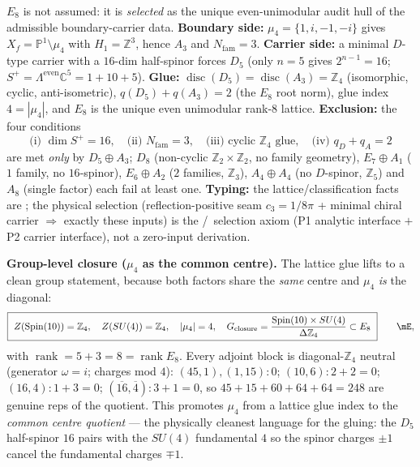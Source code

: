 \documentclass[11pt,a4paper]{article}
\newcommand{\Nfam}{N_{\mathrm{fam}}}
\newcommand{\cthree}{c_3}
\newcommand{\PP}{\mathbb{P}}
\newcommand{\Z}{\mathbb{Z}}
\theoremstyle{definition}
\begin{document}
\begin{keybox}
$E_8$ is not assumed: it is \emph{selected} as the unique even-unimodular audit hull of the admissible
boundary-carrier data. \textbf{Boundary side:} $\mu_4=\{1,i,-1,-i\}$ gives $X_f=\PP^1\setminus\mu_4$ with
$H_1=\Z^3$, hence $A_3$ and $\Nfam=3$. \textbf{Carrier side:} a minimal $D$-type carrier with a $16$-dim
half-spinor forces $D_5$ (only $n=5$ gives $2^{n-1}=16$; $S^+=\Lambda^{\mathrm{even}}\mathbb C^5=1{+}10{+}5$).
\textbf{Glue:} $\operatorname{disc}(D_5)=\operatorname{disc}(A_3)=\Z_4$ (isomorphic, cyclic, anti-isometric),
$q(D_5)+q(A_3)=2$ (the $E_8$ root norm), glue index $4=|\mu_4|$, and $E_8$ is the unique even unimodular
rank-$8$ lattice. \textbf{Exclusion:} the four conditions
\[
  \text{(i) }\dim S^+{=}16,\quad\text{(ii) }\Nfam{=}3,\quad\text{(iii) cyclic }\Z_4\text{ glue},\quad
  \text{(iv) }q_D{+}q_A{=}2
\]
are met \emph{only} by $D_5\oplus A_3$; $D_8$ (non-cyclic $\Z_2{\times}\Z_2$, no family geometry),
$E_7{\oplus}A_1$ ($1$ family, no $16$-spinor), $E_6{\oplus}A_2$ ($2$ families, $\Z_3$), $A_4{\oplus}A_4$
(no $D$-spinor, $\Z_5$) and $A_8$ (single factor) each fail at least one. \textbf{Typing:} the
lattice/classification facts are \mE; the physical selection (reflection-positive seam $\cthree=1/8\pi$ +
minimal chiral carrier $\Rightarrow$ exactly these inputs) is the \mC/\mO\ selection axiom (P1 analytic
interface $+$ P2 carrier interface), not a zero-input derivation. 
\end{keybox}

\noindent\textbf{Group-level closure ($\mu_4$ as the common centre).} The lattice glue lifts to a clean
group statement, because both factors share the \emph{same} centre and $\mu_4$ \emph{is} the diagonal:
\begin{equation}
  \boxed{\ Z(\mathrm{Spin}(10))=\mathbb Z_4,\quad Z(SU(4))=\mathbb Z_4,\quad |\mu_4|=4,\quad
  G_{\mathrm{closure}}=\frac{\mathrm{Spin}(10)\times SU(4)}{\Delta\mathbb Z_4}\subset E_8\ }\qquad\mE ,
\end{equation}
with $\operatorname{rank}=5+3=8=\operatorname{rank}E_8$. Every adjoint block is diagonal-$\mathbb Z_4$
neutral (generator $\omega=i$; charges mod $4$): $(45,1),(1,15)\!:\!0$; $(10,6)\!:\!2{+}2{=}0$;
$(16,4)\!:\!1{+}3{=}0$; $(\overline{16},\overline4)\!:\!3{+}1{=}0$, so $45{+}15{+}60{+}64{+}64=248$ are
genuine reps of the quotient. This promotes $\mu_4$ from a lattice glue index to the \emph{common centre
quotient} --- the physically cleanest language for the gluing: the $D_5$ half-spinor $16$ pairs with the
$SU(4)$ fundamental $4$ so the spinor charges $\pm1$ cancel the fundamental charges $\mp1$.
\end{document}
